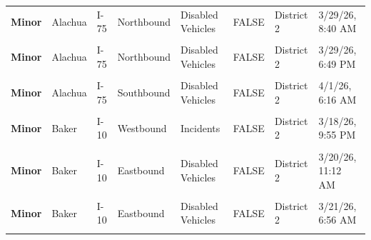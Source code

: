 \documentclass[
]{article}
\begin{document}
\begin{longtable}[t]{>{\raggedright\arraybackslash}p{1.5cm}>{\raggedright\arraybackslash}p{2.5cm}>{\raggedright\arraybackslash}p{3cm}>{\raggedright\arraybackslash}p{1.8cm}>{\raggedright\arraybackslash}p{2.5cm}lll}
\textbf{Minor} & Alachua & I-75 & Northbound & Disabled Vehicles & FALSE & District 2 & 3/29/26, 8:40 AM\\
\textbf{\cellcolor{gray!10}{Minor}} & \cellcolor{gray!10}{Alachua} & \cellcolor{gray!10}{I-75} & \cellcolor{gray!10}{Northbound} & \cellcolor{gray!10}{Disabled Vehicles} & \cellcolor{gray!10}{FALSE} & \cellcolor{gray!10}{District 2} & \cellcolor{gray!10}{3/29/26, 11:14 AM}\\
\textbf{Minor} & Alachua & I-75 & Northbound & Disabled Vehicles & FALSE & District 2 & 3/29/26, 6:49 PM\\
\addlinespace
\textbf{\cellcolor{gray!10}{Minor}} & \cellcolor{gray!10}{Alachua} & \cellcolor{gray!10}{I-75} & \cellcolor{gray!10}{Southbound} & \cellcolor{gray!10}{Disabled Vehicles} & \cellcolor{gray!10}{FALSE} & \cellcolor{gray!10}{District 2} & \cellcolor{gray!10}{3/29/26, 7:17 PM}\\
\textbf{Minor} & Alachua & I-75 & Southbound & Disabled Vehicles & FALSE & District 2 & 4/1/26, 6:16 AM\\
\textbf{\cellcolor{gray!10}{Minor}} & \cellcolor{gray!10}{Alachua} & \cellcolor{gray!10}{I-75} & \cellcolor{gray!10}{Southbound} & \cellcolor{gray!10}{Disabled Vehicles} & \cellcolor{gray!10}{FALSE} & \cellcolor{gray!10}{District 2} & \cellcolor{gray!10}{4/1/26, 8:16 PM}\\
\textbf{Minor} & Baker & I-10 & Westbound & Incidents & FALSE & District 2 & 3/18/26, 9:55 PM\\
\textbf{\cellcolor{gray!10}{Minor}} & \cellcolor{gray!10}{Baker} & \cellcolor{gray!10}{I-10} & \cellcolor{gray!10}{Westbound} & \cellcolor{gray!10}{Incidents} & \cellcolor{gray!10}{FALSE} & \cellcolor{gray!10}{District 2} & \cellcolor{gray!10}{3/19/26, 7:26 PM}\\
\addlinespace
\textbf{Minor} & Baker & I-10 & Eastbound & Disabled Vehicles & FALSE & District 2 & 3/20/26, 11:12 AM\\
\textbf{\cellcolor{gray!10}{Minor}} & \cellcolor{gray!10}{Baker} & \cellcolor{gray!10}{I-10} & \cellcolor{gray!10}{Westbound} & \cellcolor{gray!10}{Disabled Vehicles} & \cellcolor{gray!10}{FALSE} & \cellcolor{gray!10}{District 2} & \cellcolor{gray!10}{3/21/26, 12:32 AM}\\
\textbf{Minor} & Baker & I-10 & Eastbound & Disabled Vehicles & FALSE & District 2 & 3/21/26, 6:56 AM\\
\textbf{\cellcolor{gray!10}{Minor}} & \cellcolor{gray!10}{Baker} & \cellcolor{gray!10}{I-10} & \cellcolor{gray!10}{Westbound} & \cellcolor{gray!10}{Disabled Vehicles} & \cellcolor{gray!10}{FALSE} & \cellcolor{gray!10}{District 2} & \cellcolor{gray!10}{3/21/26, 7:09 AM}\\

\end{longtable}
\end{document}
